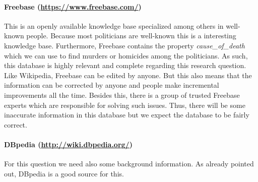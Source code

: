 \documentclass[12pt,a4paper]{article}
\begin{document}
\paragraph{\textbf{Freebase} (\url{https://www.freebase.com/})} This is an openly available knowledge base specialized among others in well-known people. Because most politicians are well-known this is a interesting knowledge base. Furthermore, Freebase contains the property \textit{cause\_of\_death} which we can use to find murders or homicides among the politicians. As such, this database is highly relevant and complete regarding this research question. Like Wikipedia, Freebase can be edited by anyone. But this also means that the information can be corrected by anyone and people make incremental improvements all the time. Besides this, there is a group of trusted Freebase experts which are responsible for solving such issues. Thus, there will be some inaccurate information in this database but we expect the database to be fairly correct. 


\paragraph{\textbf{DBpedia} (\url{http://wiki.dbpedia.org/})}
For this question we need also some background information. As already pointed out, DBpedia is a good source for this.
\end{document}
